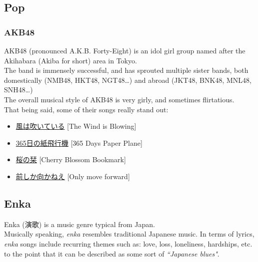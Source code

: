 \bigskip


\subsection{Pop}

\subsubsection{AKB48}

AKB48 (pronounced A.K.B. Forty-Eight) is an idol girl group named after the Akihabara (Akiba for short) area in Tokyo. \\

The band is immensely successful, and has sprouted multiple sister bands, both domestically (NMB48, HKT48, NGT48\dots) and abroad (JKT48, BNK48, MNL48, SNH48\dots) \\

The overall musical style of AKB48 is very girly, and sometimes flirtatious. \\

That being said, some of their songs really stand out:

\begin{itemize}
	\item \href{https://www.youtube.com/watch?v=fgESmgZ4ld8}{風は吹いている} [The Wind is Blowing] 
	\item \href{https://www.youtube.com/watch?v=JUbU6VLV6yI}{365日の紙飛行機} [365 Days Paper Plane]
	\item \href{https://www.youtube.com/watch?v=hUOc1yc8cH0}{桜の栞} [Cherry Blossom Bookmark]
	\item \href{https://www.youtube.com/watch?v=n24zp_wPC7E}{前しか向かねえ} [Only move forward]	
\end{itemize}





\bigskip
\subsection{Enka}

Enka (演歌) is a music genre typical from Japan. \\

Musically speaking, \emph{enka} resembles traditional Japanese music. In terms of lyrics, \emph{enka} songs include recurring themes such as: love, loss, loneliness, hardships, etc. to the point that it can be described as some sort of \emph{``Japanese blues"}. \\

